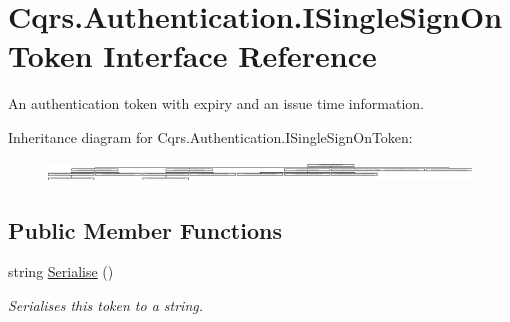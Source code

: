 \hypertarget{interfaceCqrs_1_1Authentication_1_1ISingleSignOnToken}{}\section{Cqrs.\+Authentication.\+I\+Single\+Sign\+On\+Token Interface Reference}
\label{interfaceCqrs_1_1Authentication_1_1ISingleSignOnToken}


An authentication token with expiry and an issue time information.  


Inheritance diagram for Cqrs.\+Authentication.\+I\+Single\+Sign\+On\+Token\+:\begin{figure}[H]
\begin{center}
\leavevmode
\includegraphics[height=0.534096cm]{interfaceCqrs_1_1Authentication_1_1ISingleSignOnToken}
\end{center}
\end{figure}
\subsection*{Public Member Functions}
\begin{DoxyCompactItemize}
\item 
string \hyperlink{interfaceCqrs_1_1Authentication_1_1ISingleSignOnToken_af34e8c0b052865d687064d3381bfbcdb_af34e8c0b052865d687064d3381bfbcdb}{Serialise} ()
\begin{DoxyCompactList}\small\item\em Serialises this token to a string. \end{DoxyCompactList}\end{DoxyCompactItemize}
